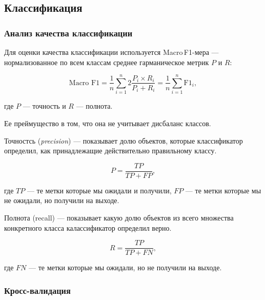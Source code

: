 \subsection{Классификация}


\subsubsection{Анализ качества классификации}

Для оценки качества классификации используется Macro\,F1-мера --- нормализованное по всем классам среднее гарманическое метрик $P$ и $R$:

    \begin{equation*}
    \text{Macro F1} =  \frac{1}{n}\sum_{i=1}^n 2\frac{P_i\times R_i}{P_i + R_i} = \frac{1}{n}\sum_{i=1}^n
\text{F1}_i,
    \end{equation*}

где $P$ --- точность и $R$ --- полнота.

\bigskip\noindent
Ее преймущество в том, что она не учитывает дисбаланс классов.

\begin{definition}
 Точностсь (\textit{precision}) --- показывает долю объектов, которые классификатор определил, как принадлежащие действительно правильному классу.
\end{definition}

\begin{equation*}
 P = \frac{TP}{TP + FP},
\end{equation*}

\bigskip
где $TP$ --- те метки которые мы ожидали и получили, $FP$ --- те метки которые мы не ожидали, но получили на выходе.

\begin{definition}
 Полнота (recall) --- показывает какую долю объектов из всего множества конкретного класса калассификатор определил верно.
\end{definition}

\begin{equation*}
 R = \frac{TP}{TP + FN},
\end{equation*}

\bigskip
где $FN$ --- те метки которые мы ожидали, но не получили на выходе.




\subsubsection{Кросс-валидация}

